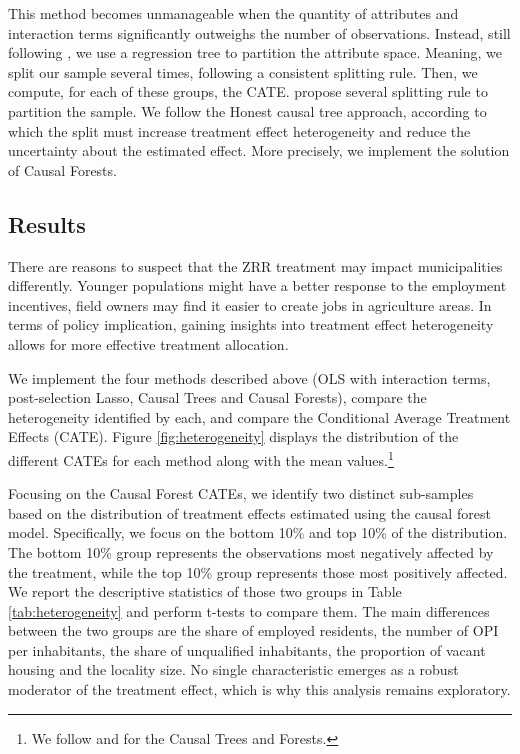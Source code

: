 \begin{appendices}
This method becomes unmanageable when the quantity of attributes and interaction terms significantly outweighs the number of observations. Instead, still following \cite{athey2017}, we use a regression tree to partition the attribute space. Meaning, we split our sample several times, following a consistent splitting rule. Then, we compute, for each of these groups, the CATE.  \cite{athey2017} propose several splitting rule to partition the sample. We follow the Honest causal tree approach, according to which the split must increase treatment effect heterogeneity and reduce the uncertainty about the estimated effect. More precisely, we implement the \cite{Wager2018} solution of Causal Forests.

\subsection{Results}

There are reasons to suspect that the ZRR treatment may impact municipalities differently. Younger populations might have a better response to the employment incentives, field owners may find it easier to create jobs in agriculture areas. In terms of policy implication, gaining insights into treatment effect heterogeneity allows for more effective treatment allocation.

We implement the four methods described above (OLS with interaction terms, post-selection Lasso, Causal Trees and Causal Forests), compare the heterogeneity identified by each, and compare the Conditional Average Treatment Effects (CATE). Figure \ref{fig:heterogeneity} displays the distribution of the different CATEs for each method along with the mean values.\footnote{We follow \cite{Athey2015RecursivePF} and \cite{Wager2018} for the Causal Trees and Forests.}

Focusing on the Causal Forest CATEs, we identify two distinct sub-samples based on the distribution of treatment effects estimated using the causal forest model. Specifically, we focus on the bottom 10\% and top 10\% of the distribution. The bottom 10\% group represents the observations most negatively affected by the treatment, while the top 10\% group represents those most positively affected. We report the descriptive statistics of those two groups in Table \ref{tab:heterogeneity} and perform t-tests to compare them. The main differences between the two groups are the share of employed residents, the number of OPI per inhabitants, the share of unqualified inhabitants, the proportion of vacant housing and the locality size. No single characteristic emerges as a robust moderator of the treatment effect, which is why this analysis remains exploratory.


\end{appendices}
